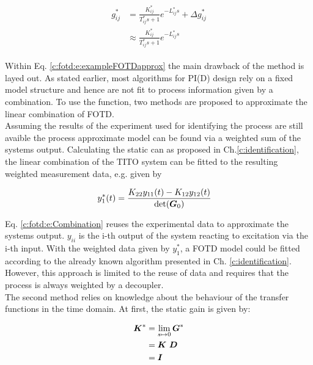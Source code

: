 \begin{align}
\begin{split}
g_{ij}^* & = \frac{K_{ij}^*}{T_{ij}^*s+1}e^{-L_{ij}^* s} + \Delta g_{ij}^*\\
&\approx \frac{K_{ij}^*}{T_{ij}^*s+1}e^{-L_{ij}^* s} 
\end{split}
\label{c:fotd:e:exampleFOTDapprox}
\end{align}

Within Eq. \ref{c:fotd:e:exampleFOTDapprox} the main drawback of the method is layed out. As stated earlier, most algorithms for PI(D) design rely on a fixed model structure and hence are not fit to process information given by a combination. To use the function, two methods are proposed to approximate the linear combination of FOTD.\\

Assuming the results of the experiment used for identifying the process are still avaible the process approximate model can be found via a weighted sum of the systems output. Calculating the static can as proposed in Ch.\ref{c:identification}, the linear combination of the TITO system can be fitted to the resulting weighted measurement data, e.g. given by

\begin{align}
\begin{split}
y_{1}^*(t) &= \frac{K_{22} y_{11}(t) - K_{12} y_{12}(t)}{\det(\mbox{\boldmath$G$}_0)}
\end{split}
\label{c:fotd:e:Combination}
\end{align}

Eq. \ref{c:fotd:e:Combination} reuses the experimental data to approximate the systems output. $y_{ii}$ is the i-th output of the system reacting to excitation via the i-th input. With the weighted data given by $y_{1}^*$, a FOTD model could be fitted according to the already known algorithm presented in Ch. \ref{c:identification}. However, this approach is limited to the reuse of data and requires that the process is always weighted by a decoupler.\\

The second method relies on knowledge about the behaviour of the transfer functions in the time domain. At first, the static gain is given by:

\begin{align}
\begin{split}
\mbox{\boldmath$K$}^* &= \lim_{s\mapsto 0} \mbox{\boldmath$G$}^* \\
&= \mbox{\boldmath$K$} ~\mbox{\boldmath$D$} \\
&= \mbox{\boldmath$I$}
\end{split}
\label{c:fotd:e:CombinationGain}
\end{align}

